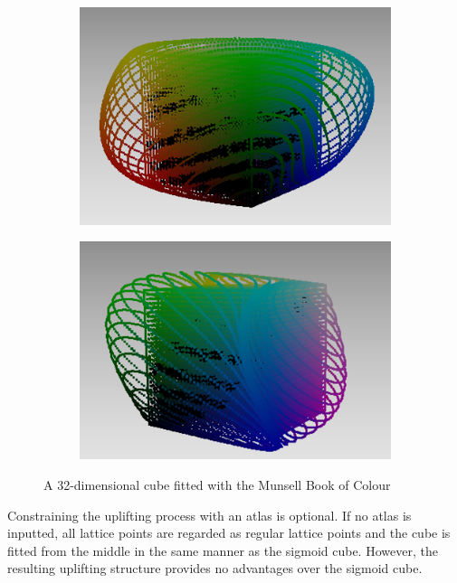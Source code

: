 \begin{figure}[t!]
\begin{subfigure}[t]{0.22\textwidth}
		\includegraphics[width=\linewidth]{img/seededCube_mcb3.png}
		\label{fig:seededCube_mcb3}
	\end{subfigure} \hspace{0.05em}
	\begin{subfigure}[t]{0.22\textwidth}
		\includegraphics[width=\linewidth]{img/seededCube_mcb4.png}
		\label{fig:seededCube_mcb4}
	\end{subfigure}
	\caption{A 32-dimensional cube fitted with the Munsell Book of Colour}
	\label{fig:seededCubeMCB}
\end{figure}

Constraining the uplifting process with an atlas is optional. If no atlas is inputted, all lattice points are regarded as regular lattice points and the cube is fitted from the middle in the same manner as the sigmoid cube. However, the resulting uplifting structure provides no advantages over the sigmoid cube.


